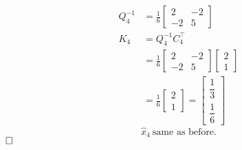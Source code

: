 \documentclass[letterpaper]{article}
\begin{document}
\begin{enumerate}
\begin{enumerate}
$$\begin{aligned}Q_4^{-1} &= \frac{1}{6}\left[\begin{array}{cc} 2 & -2 \\ -2 & 5 \end{array}\right]\\
K_4 &= Q_4^{-1} C_4^\top \\
&= \frac{1}{6} \left[\begin{array}{cc} 2 & -2 \\ -2 & 5 \end{array}\right] \begin{bmatrix} 2 \\ 1 \end{bmatrix} \\
&= \frac{1}{6} \begin{bmatrix} 2 \\ 1 \end{bmatrix} = \begin{bmatrix} \dfrac{1}{3} \\[2ex] \dfrac{1}{6}\end{bmatrix}\end{aligned}$$
$$\widehat{x}_4 ~\text{same as before}.$$ $\hfill \square$
\end{enumerate}
\end{enumerate}
\end{document}
